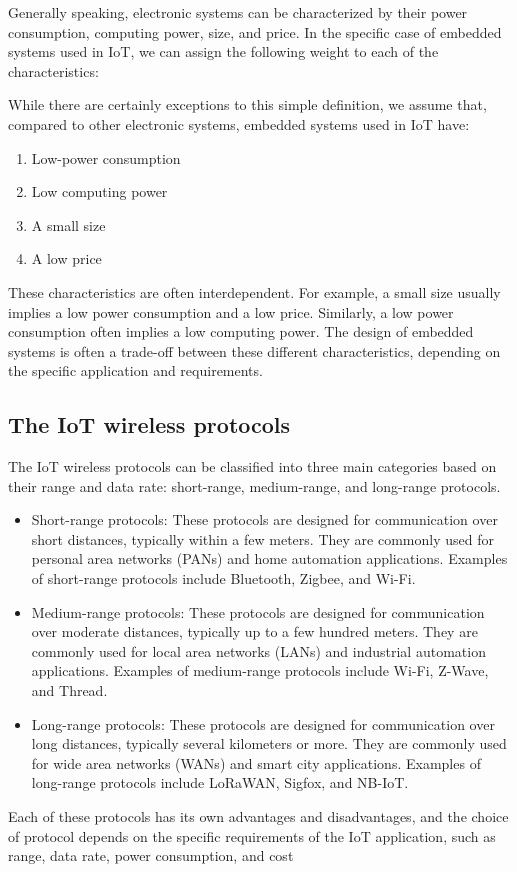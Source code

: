 Generally speaking, electronic systems can be characterized by their power consumption,
computing power, size, and price. In the specific case of embedded systems used in IoT, we can
assign the following weight to each of the characteristics:

While there are certainly exceptions to this simple definition, we assume that, compared to other
electronic systems, embedded systems used in IoT have:
\begin{enumerate}
    \item Low-power consumption
    \item Low computing power
    \item A small size
    \item A low price
\end{enumerate}
These characteristics are often interdependent. For example, a small size usually implies a low
power consumption and a low price. Similarly, a low power consumption often implies a low
computing power. The design of embedded systems is often a trade-off between these different
characteristics, depending on the specific application and requirements.

\subsection{The IoT wireless protocols}
The IoT wireless protocols can be classified into three main categories based on their range and data rate: short-range, medium-range, and long-range protocols.
\begin{itemize}
    \item Short-range protocols: These protocols are designed for communication over short distances, typically within a few meters. They are commonly used for personal area networks (PANs) and home automation applications. Examples of short-range protocols include Bluetooth, Zigbee, and Wi-Fi.
    \item Medium-range protocols: These protocols are designed for communication over moderate distances, typically up to a few hundred meters. They are commonly used for local area networks (LANs) and industrial automation applications. Examples of medium-range protocols include Wi-Fi, Z-Wave, and Thread.
    \item Long-range protocols: These protocols are designed for communication over long distances, typically several kilometers or more. They are commonly used for wide area networks (WANs) and smart city applications. Examples of long-range protocols include LoRaWAN, Sigfox, and NB-IoT.
\end{itemize}
Each of these protocols has its own advantages and disadvantages, and the choice of protocol depends on the specific requirements of the IoT application, such as range, data rate, power consumption, and cost

